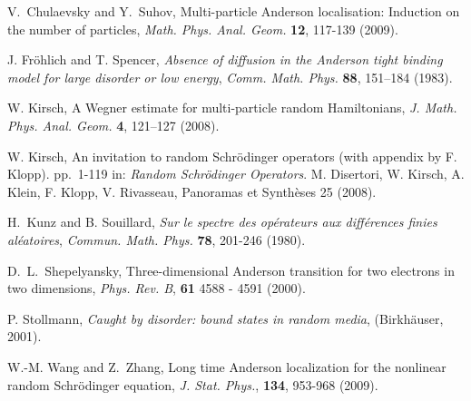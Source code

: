 \documentclass[reqno,keywordsasfootnote]{article}
\numberwithin{equation}{section}
\theoremstyle{definition}
\begin{document}
\begin{thebibliography}{99}
 V.~Chulaevsky and Y.~Suhov, 
Multi-particle Anderson localisation: Induction on the number of particles, 
{\em Math. Phys. Anal. Geom.} {\bf 12}, 117-139 (2009). 

 J. Fr\"ohlich and T. Spencer,
{\it Absence of diffusion in the Anderson tight binding model for large 
    disorder or low energy},
{\em Comm. Math. Phys.} {\bf 88}, 151--184 (1983).

W. Kirsch,
A Wegner estimate for multi-particle random Hamiltonians, 
{\it J. Math. Phys. Anal. Geom.} {\bf 4}, 121--127 (2008).

W. Kirsch, 
An invitation to random Schr\"odinger operators
(with appendix by F. Klopp).
pp.~1-119 in: {\em Random Schr\"odinger Operators}. 
M. Disertori, W. Kirsch, A. Klein, F. Klopp, V.
Rivasseau, 
Panoramas et Synth\`eses 25 (2008).

H.~Kunz and B. Souillard,
{\it Sur le spectre des op\'erateurs aux diff\'erences finies al\'eatoires}, 
{\em Commun. Math. Phys.} {\bf 78}, 201-246 (1980).

D.~L.~Shepelyansky, 
Three-dimensional Anderson transition for two electrons in two dimensions, 
{\it Phys. Rev. B}, {\bf 61} 4588 - 4591 (2000).

P. Stollmann, 
{\em Caught by disorder: bound states in random media}, 
(Birkh\"auser, 2001).

W.-M. Wang and Z.~Zhang, Long time Anderson localization for the nonlinear 
random Schr\"odinger equation, 	{\it J. Stat. Phys.}, {\bf 134}, 953-968 (2009).
\end{thebibliography}
\end{document}
